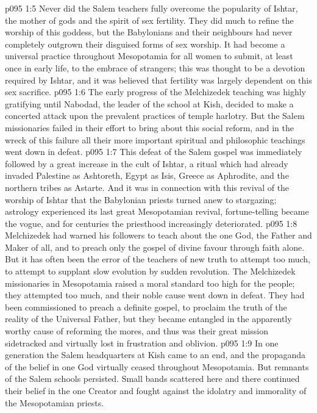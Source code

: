 \vs p095 1:5 Never did the Salem teachers fully overcome the popularity of Ishtar, the mother of gods and the spirit of sex fertility. They did much to refine the worship of this goddess, but the Babylonians and their neighbours had never completely outgrown their disguised forms of sex worship. It had become a universal practice throughout Mesopotamia for all women to submit, at least once in early life, to the embrace of strangers; this was thought to be a devotion required by Ishtar, and it was believed that fertility was largely dependent on this sex sacrifice.
\vs p095 1:6 \pc The early progress of the Melchizedek teaching was highly gratifying until Nabodad, the leader of the school at Kish, decided to make a concerted attack upon the prevalent practices of temple harlotry. But the Salem missionaries failed in their effort to bring about this social reform, and in the wreck of this failure all their more important spiritual and philosophic teachings went down in defeat.
\vs p095 1:7 This defeat of the Salem gospel was immediately followed by a great increase in the cult of Ishtar, a ritual which had already invaded Palestine as Ashtoreth, Egypt as Isis, Greece as Aphrodite, and the northern tribes as Astarte. And it was in connection with this revival of the worship of Ishtar that the Babylonian priests turned anew to stargazing; astrology experienced its last great Mesopotamian revival, fortune-telling became the vogue, and for centuries the priesthood increasingly deteriorated.
\vs p095 1:8 Melchizedek had warned his followers to teach about the one God, the Father and Maker of all, and to preach only the gospel of divine favour through faith alone. But it has often been the error of the teachers of new truth to attempt too much, to attempt to supplant slow evolution by sudden revolution. The Melchizedek missionaries in Mesopotamia raised a moral standard too high for the people; they attempted too much, and their noble cause went down in defeat. They had been commissioned to preach a definite gospel, to proclaim the truth of the reality of the Universal Father, but they became entangled in the apparently worthy cause of reforming the mores, and thus was their great mission sidetracked and virtually lost in frustration and oblivion.
\vs p095 1:9 In one generation the Salem headquarters at Kish came to an end, and the propaganda of the belief in one God virtually ceased throughout Mesopotamia. But remnants of the Salem schools persisted. Small bands scattered here and there continued their belief in the one Creator and fought against the idolatry and immorality of the Mesopotamian priests.
